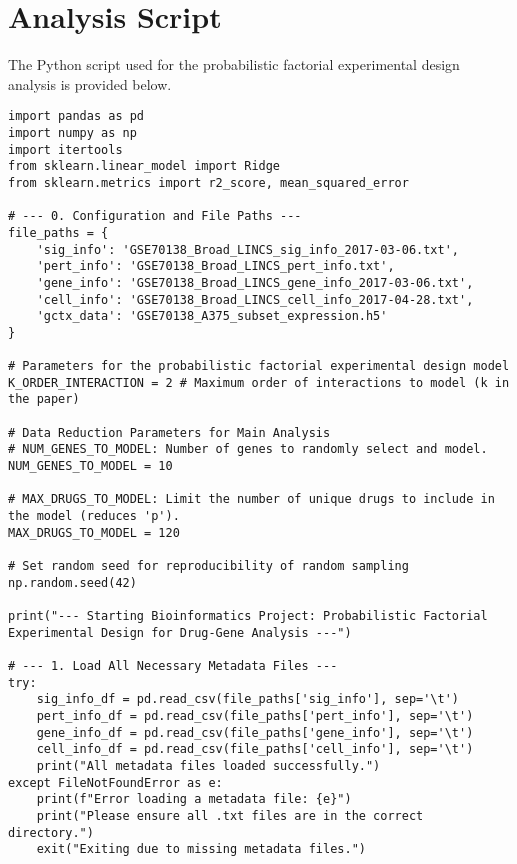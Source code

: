 \documentclass[12pt]{article}
\begin{document}
\appendix
\section{Analysis Script}
\label{sec:code_appendix}

The Python script used for the probabilistic factorial experimental design analysis is provided below.

\begin{lstlisting}[caption={Python Analysis Script}]
import pandas as pd
import numpy as np
import itertools
from sklearn.linear_model import Ridge
from sklearn.metrics import r2_score, mean_squared_error

# --- 0. Configuration and File Paths ---
file_paths = {
    'sig_info': 'GSE70138_Broad_LINCS_sig_info_2017-03-06.txt',
    'pert_info': 'GSE70138_Broad_LINCS_pert_info.txt',
    'gene_info': 'GSE70138_Broad_LINCS_gene_info_2017-03-06.txt',
    'cell_info': 'GSE70138_Broad_LINCS_cell_info_2017-04-28.txt',
    'gctx_data': 'GSE70138_A375_subset_expression.h5'
}

# Parameters for the probabilistic factorial experimental design model
K_ORDER_INTERACTION = 2 # Maximum order of interactions to model (k in the paper)

# Data Reduction Parameters for Main Analysis
# NUM_GENES_TO_MODEL: Number of genes to randomly select and model.
NUM_GENES_TO_MODEL = 10

# MAX_DRUGS_TO_MODEL: Limit the number of unique drugs to include in the model (reduces 'p').
MAX_DRUGS_TO_MODEL = 120

# Set random seed for reproducibility of random sampling
np.random.seed(42)

print("--- Starting Bioinformatics Project: Probabilistic Factorial Experimental Design for Drug-Gene Analysis ---")

# --- 1. Load All Necessary Metadata Files ---
try:
    sig_info_df = pd.read_csv(file_paths['sig_info'], sep='\t')
    pert_info_df = pd.read_csv(file_paths['pert_info'], sep='\t')
    gene_info_df = pd.read_csv(file_paths['gene_info'], sep='\t')
    cell_info_df = pd.read_csv(file_paths['cell_info'], sep='\t')
    print("All metadata files loaded successfully.")
except FileNotFoundError as e:
    print(f"Error loading a metadata file: {e}")
    print("Please ensure all .txt files are in the correct directory.")
    exit("Exiting due to missing metadata files.")



\end{lstlisting}
\end{document}
